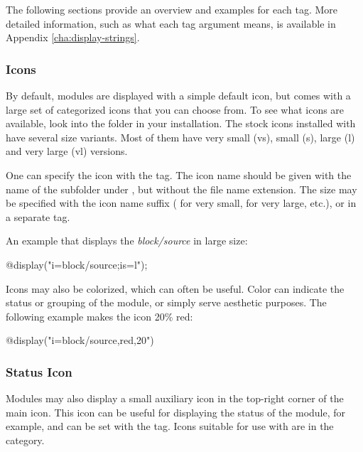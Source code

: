 The following sections provide an overview and examples for each tag. More
detailed information, such as what each tag argument means, is available in
Appendix \ref{cha:display-strings}.

\subsubsection{Icons}
\label{sec:graphics:submodule-icons}

By default, modules are displayed with a simple default icon, but {\opp}
comes with a large set of categorized icons that you can choose from.
To see what icons are available, look into the  folder
in your {\opp} installation. The stock icons installed with {\opp} have
several size variants. Most of them have very small (vs), small (s),
large (l) and very large (vl) versions.

One can specify the icon with the  tag. The icon name should be
given with the name of the subfolder under , but without the
file name extension. The size may be specified with the icon name suffix
( for very small,  for very large, etc.), or
in a separate  tag.

An example that displays the \textit{block/source} in large size:

\begin{ned}
@display("i=block/source;is=l");
\end{ned}

Icons may also be colorized, which can often be useful. Color can indicate
the status or grouping of the module, or simply serve aesthetic purposes.
The following example makes the icon 20\% red:

\begin{ned}
@display("i=block/source,red,20")
\end{ned}

\begin{center}
\end{center}

\subsubsection{Status Icon}
\label{sec:graphics:submodule-status-icon}

Modules may also display a small auxiliary icon in the top-right corner of
the main icon. This icon can be useful for displaying the status of the
module, for example, and can be set with the  tag. Icons suitable
for use with  are in the  category.

